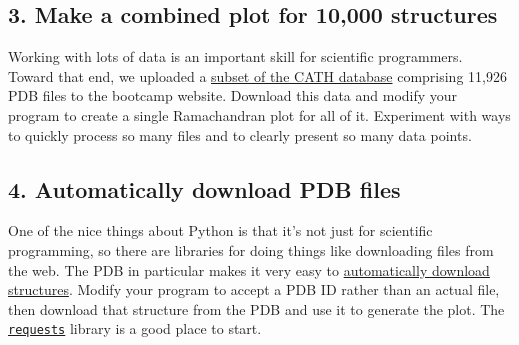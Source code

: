 \documentclass{article}
\newcommand{\module}[2]{\href{#2}{\texttt{#1}}}
\begin{document}
\subsection{3. Make a combined plot for 10,000 structures}

Working with lots of data is an important skill for scientific programmers.  
Toward that end, we uploaded a 
\href{ftp://ftp.biochem.ucl.ac.uk/pub/cath/v3_5_0/CathDomainPdb.S35.v3.5.0.tgz}{subset 
of the CATH database} comprising 11,926 PDB files to the bootcamp website.  
Download this data and modify your program to create a single Ramachandran plot 
for all of it.  Experiment with ways to quickly process so many files and to 
clearly present so many data points.

\subsection{4. Automatically download PDB files}

One of the nice things about Python is that it's not just for scientific 
programming, so there are libraries for doing things like downloading files 
from the web.  The PDB in particular makes it very easy to 
\href{http://www.rcsb.org/pdb/software/rest.do#search}{automatically download 
structures}.  Modify your program to accept a PDB ID rather than an actual 
file, then download that structure from the PDB and use it to generate the 
plot.  The \module{requests}{http://docs.python-requests.org} library is a good 
place to start.
\end{document}
